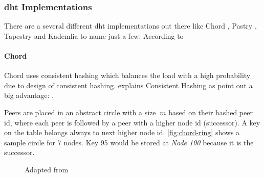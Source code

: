 \subsubsection{\gls{dht} Implementations}
There are a several different \gls{dht} implementations out there like Chord \cite{chord}, Pastry \cite{pastry}, Tapestry \cite{tapestry} and Kademlia \cite{kademlia} to name just a few.
According to \citet[\S7.5]{tanenbaum_wetherall_2011} 

\paragraph{Chord}
Chord uses consistent hashing which balances the load with a high probability due to design of consistent hashing. \citet{consistentHashing} explains Consistent Hashing as  \citet[\S4.2]{chord} point out a big advantage: .

Peers are placed in an abstract circle with a size $\ m $ based on their hashed peer id, where each peer is followed by a peer with a higher node id (successor). A key on the table belongs always to next higher node id. \vref{fig:chord-ring} shows a sample circle for 7 nodes. Key 95 would be stored at \textit{Node 100} because it is the successor.

\begin{figure}
  \centering
	\caption{Adapted from \cite{chord}}
\label{fig:chord}
\end{figure}

